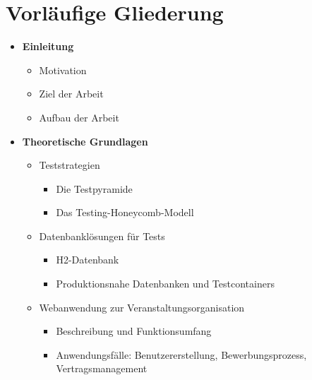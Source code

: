 \chapter{Vorläufige Gliederung}

\begin{itemize}
	\item \textbf{Einleitung}
	\begin{itemize}
		\item Motivation
		\item Ziel der Arbeit
		\item Aufbau der Arbeit
	\end{itemize}
	
	\item \textbf{Theoretische Grundlagen}
	\begin{itemize}
		\item Teststrategien
		\begin{itemize}
			\item Die Testpyramide
			\item Das Testing-Honeycomb-Modell
		\end{itemize}
		\item Datenbanklösungen für Tests
		\begin{itemize}
			\item H2-Datenbank
			\item Produktionsnahe Datenbanken und Testcontainers
		\end{itemize}
		\item Webanwendung zur Veranstaltungsorganisation
		\begin{itemize}
			\item Beschreibung und Funktionsumfang
			\item Anwendungsfälle: Benutzererstellung, Bewerbungsprozess, Vertragsmanagement
		\end{itemize}
	\end{itemize}
	

\end{itemize}
